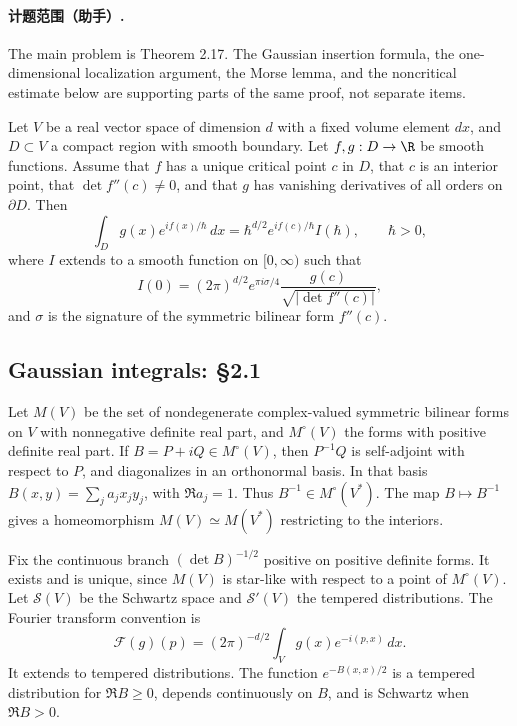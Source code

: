
\paragraph{计题范围（助手）.} The main problem is Theorem 2.17. The Gaussian insertion formula, the one-dimensional localization argument, the Morse lemma, and the noncritical estimate below are supporting parts of the same proof, not separate items.

\begin{theorem}
Let $V$ be a real vector space of dimension $d$ with a fixed volume element $dx$, and $D\subset V$ a compact region with smooth boundary. Let $f,g:D\to\R$ be smooth functions. Assume that $f$ has a unique critical point $c$ in $D$, that $c$ is an interior point, that $\det f''(c)\ne0$, and that $g$ has vanishing derivatives of all orders on $\partial D$. Then
\[
\int_D g(x)e^{if(x)/\hbar}\,dx
=\hbar^{d/2}e^{if(c)/\hbar}I(\hbar),\qquad \hbar>0,
\]
where $I$ extends to a smooth function on $[0,\infty)$ such that
\[
I(0)=(2\pi)^{d/2}e^{\pi i\sigma/4}
\frac{g(c)}{\sqrt{|\det f''(c)|}},
\]
and $\sigma$ is the signature of the symmetric bilinear form $f''(c)$.
\end{theorem}

\subsection*{Gaussian integrals: §2.1}
Let $M(V)$ be the set of nondegenerate complex-valued symmetric bilinear forms on $V$ with nonnegative definite real part, and $M^\circ(V)$ the forms with positive definite real part. If $B=P+iQ\in M^\circ(V)$, then $P^{-1}Q$ is self-adjoint with respect to $P$, and diagonalizes in an orthonormal basis. In that basis $B(x,y)=\sum_j a_jx_jy_j$, with $\Re a_j=1$. Thus $B^{-1}\in M^\circ(V^*)$. The map $B\mapsto B^{-1}$ gives a homeomorphism $M(V)\simeq M(V^*)$ restricting to the interiors.

Fix the continuous branch $(\det B)^{-1/2}$ positive on positive definite forms. It exists and is unique, since $M(V)$ is star-like with respect to a point of $M^\circ(V)$. Let $\mathcal S(V)$ be the Schwartz space and $\mathcal S'(V)$ the tempered distributions. The Fourier transform convention is
\[
\mathcal F(g)(p)=(2\pi)^{-d/2}\int_V g(x)e^{-i(p,x)}\,dx.
\]
It extends to tempered distributions. The function $e^{-B(x,x)/2}$ is a tempered distribution for $\Re B\ge0$, depends continuously on $B$, and is Schwartz when $\Re B>0$.

